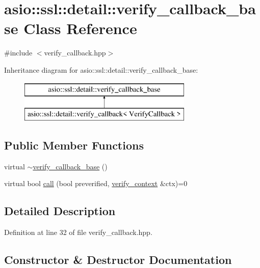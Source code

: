 \hypertarget{classasio_1_1ssl_1_1detail_1_1verify__callback__base}{}\section{asio\+:\+:ssl\+:\+:detail\+:\+:verify\+\_\+callback\+\_\+base Class Reference}
\label{classasio_1_1ssl_1_1detail_1_1verify__callback__base}


{\ttfamily \#include $<$verify\+\_\+callback.\+hpp$>$}

Inheritance diagram for asio\+:\+:ssl\+:\+:detail\+:\+:verify\+\_\+callback\+\_\+base\+:\begin{figure}[H]
\begin{center}
\leavevmode
\includegraphics[height=2.000000cm]{classasio_1_1ssl_1_1detail_1_1verify__callback__base}
\end{center}
\end{figure}
\subsection*{Public Member Functions}
\begin{DoxyCompactItemize}
\item 
virtual \hyperlink{classasio_1_1ssl_1_1detail_1_1verify__callback__base_a6896db1b70d5cc0b8165203a29084419}{$\sim$verify\+\_\+callback\+\_\+base} ()
\item 
virtual bool \hyperlink{classasio_1_1ssl_1_1detail_1_1verify__callback__base_a1b639922c74bd99d05a8b1fdda6cef3b}{call} (bool preverified, \hyperlink{classasio_1_1ssl_1_1verify__context}{verify\+\_\+context} \&ctx)=0
\end{DoxyCompactItemize}


\subsection{Detailed Description}


Definition at line 32 of file verify\+\_\+callback.\+hpp.



\subsection{Constructor \& Destructor Documentation}
\hypertarget{classasio_1_1ssl_1_1detail_1_1verify__callback__base_a6896db1b70d5cc0b8165203a29084419}{}
